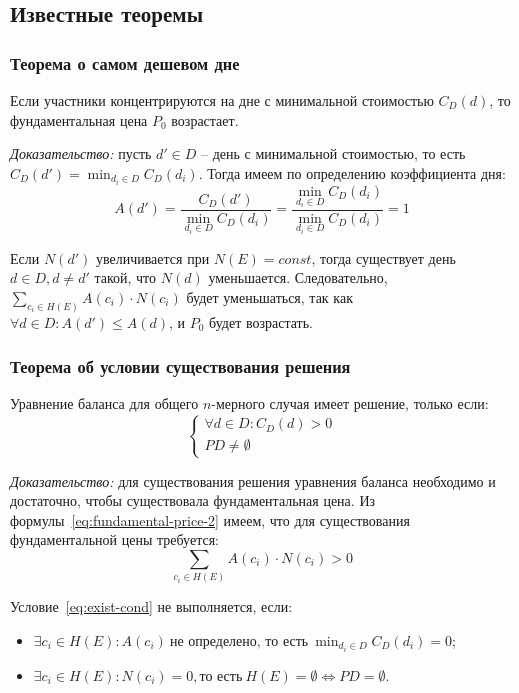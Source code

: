\subsection{Известные теоремы}

\subsubsection{Теорема о самом дешевом дне}

Если участники концентрируются на дне с минимальной стоимостью $C_D(d)$, то фундаментальная цена $P_0$ возрастает.

\textit{Доказательство:} пусть $d' \in D$ -- день с минимальной стоимостью, то есть $C_D(d') = \min_{d_i \in D}{C_D(d_i)}$. Тогда имеем по определению коэффициента дня:
\begin{equation}
	A(d') = \frac{C_D(d')}{\min_{d_i \in D}{C_D(d_i)}} = \frac{\min_{d_i \in D}{C_D(d_i)}}{\min_{d_i \in D}{C_D(d_i)}} = 1
\end{equation}

Если $N(d')$ увеличивается при $N(E) = const$, тогда существует день \newline $d \in D, d \ne d'$ такой, что $N(d)$ уменьшается. Следовательно, $\sum_{c_i \in H(E)}{A(c_i) \cdot N(c_i)}$ будет уменьшаться, так как $\forall d \in D: A(d') \le A(d)$, и $P_0$ будет возрастать.

\subsubsection{Теорема об условии существования решения}

Уравнение баланса для общего $n$-мерного случая имеет решение, только если:
\begin{equation}
	\begin{cases}
		\forall d \in D: C_D(d) > 0 \\
		PD \ne \emptyset
	\end{cases}
\end{equation}

\textit{Доказательство:} для существования решения уравнения баланса необходимо и достаточно, чтобы существовала фундаментальная цена. Из формулы~\ref{eq:fundamental-price-2} имеем, что для существования фундаментальной цены требуется:
\begin{equation}
	\sum_{c_i \in H(E)}{A(c_i) \cdot N(c_i)} > 0
	\label{eq:exist-cond}
\end{equation}

Условие~\ref{eq:exist-cond} не выполняется, если:
\begin{itemize}[label=--]
	\item $\exists c_i \in H(E): A(c_i) \ \text{не определено, то есть} \ \min_{d_i \in D}{C_D(d_i)} = 0$;
	\item $\exists c_i \in H(E): N(c_i) = 0, \text{то есть} \ H(E) = \emptyset \Leftrightarrow PD = \emptyset$.
\end{itemize}

